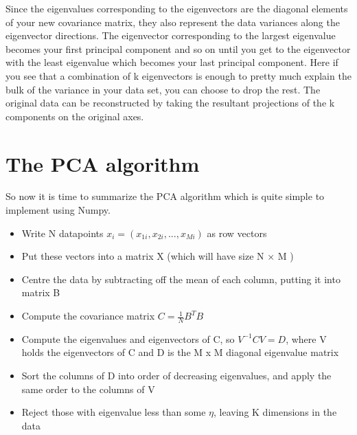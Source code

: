 \documentclass{../template/texnote}
\begin{document}
Since the eigenvalues corresponding to the eigenvectors are the diagonal elements of your new covariance matrix, they also represent the data variances along the eigenvector directions. The eigenvector corresponding to the largest eigenvalue becomes your first principal component and so on until you get to the eigenvector with the least eigenvalue which becomes your last principal component.
Here if you see that a combination of k eigenvectors is enough to pretty much explain the bulk of the variance in your data set, you can choose to drop the rest.
The original data can be reconstructed by taking the resultant projections of the k components on the original axes.
\section{The PCA algorithm}
So now it is time to summarize the PCA algorithm which is quite simple to implement using Numpy.
	\begin{itemize}
		\item Write N datapoints $x_{i} = (x_{1i}, x_{2i}, . . . , x_{Mi})$ as row vectors
		\item Put these vectors into a matrix X (which will have size N × M )
		\item Centre the data by subtracting off the mean of each column, putting it into matrix B
		\item Compute the covariance matrix $C = \frac{1}{N} B^{T} B$
		\item Compute the eigenvalues and eigenvectors of C, so $V^{-1}CV = D$, where V holds the eigenvectors of C and D is the M x M diagonal eigenvalue matrix
		\item Sort the columns of D into order of decreasing eigenvalues, and apply the same order to the columns of V
		\item Reject those with eigenvalue less than some $\eta$, leaving K dimensions in the data

	\end{itemize}

    \printbibliography
\end{document}
